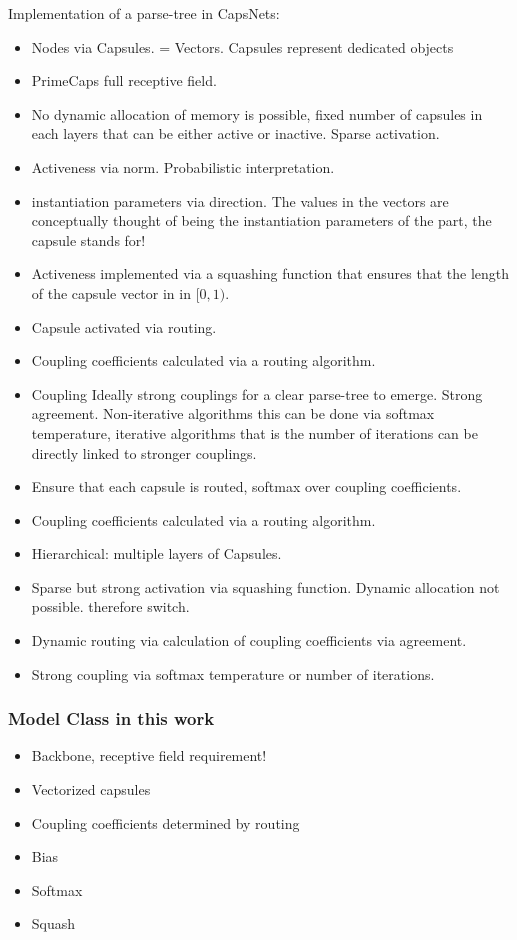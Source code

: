 \documentclass{article}
\begin{document}
Implementation of a parse-tree in CapsNets:
\begin{itemize}
	\item Nodes via Capsules. = Vectors. Capsules represent dedicated objects
	\item PrimeCaps full receptive field.
	\item No dynamic allocation of memory is possible, fixed number of capsules in each layers that can be either active or inactive. Sparse activation.
	\item Activeness via norm. Probabilistic interpretation.
	\item instantiation parameters via direction. The values in the vectors are conceptually thought of being the instantiation parameters of the part, the capsule stands for!
	\item Activeness implemented via a squashing function that ensures that the length of the capsule vector in in $[0,1)$.
	\item Capsule activated via routing.
	\item Coupling coefficients calculated via a routing algorithm.
	\item Coupling Ideally strong couplings for a clear parse-tree to emerge. Strong agreement. Non-iterative algorithms this can be done via softmax temperature, iterative algorithms that is the number of iterations can be directly linked to stronger couplings.
	\item Ensure that each capsule is routed, softmax over coupling coefficients.
	\item Coupling coefficients calculated via a routing algorithm.
	\item Hierarchical: multiple layers of Capsules.
	\item Sparse but strong activation via squashing function. Dynamic allocation not possible. therefore switch.
	\item Dynamic routing via calculation of coupling coefficients via agreement.
	\item Strong coupling via softmax temperature or number of iterations.
\end{itemize}


\subsubsection*{Model Class in this work}
\begin{itemize}
	\item Backbone, receptive field requirement!
	\item Vectorized capsules
	\item Coupling coefficients determined by routing
	\item Bias
	\item Softmax
	\item Squash
\end{itemize}
\end{document}
